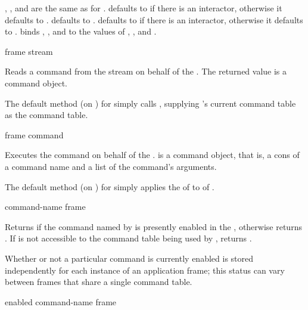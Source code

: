 , , and 
are the same as for .   defaults to
 if there is an interactor, otherwise it
defaults to .   defaults to
.   defaults to
 if there is an
interactor, otherwise it defaults to
.
 binds ,
, and  to the values of
, , and .


 {frame stream}

Reads a command from the stream  on behalf of the 
.  The returned value is a command object.

The default method (on ) for
 simply calls , supplying 's
current command table as the command table.

 {frame command}

Executes the command  on behalf of the  .
 is a command object, that is, a cons of a command name and a list
of the command's arguments.

The default method (on ) for
 simply applies the  of 
to  of .


 {command-name frame}

Returns  if the command named by  is presently
enabled in the  , otherwise returns .  If
 is not accessible to the command table being used by
,  returns .

Whether or not a particular command is currently enabled is stored independently
for each instance of an application frame; this status can vary between frames
that share a single command table.

 {enabled command-name frame}


